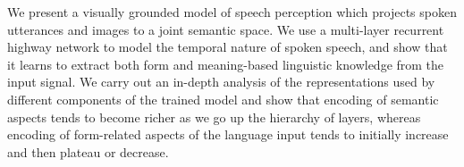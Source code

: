 We present a visually grounded model of speech perception which projects spoken utterances and images to a joint semantic space. We use a multi-layer recurrent highway network to model the temporal nature of spoken speech, and show that it learns to extract both form and meaning-based linguistic knowledge from the input signal. We carry out an in-depth analysis of the representations used by different components of the trained model and show that encoding of semantic aspects tends to become richer as we go up the hierarchy of layers, whereas encoding of form-related aspects of the language input tends to initially increase and then plateau or decrease.

